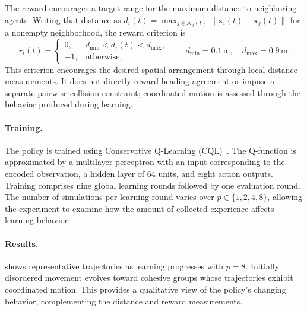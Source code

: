 The reward encourages a target range for the maximum distance to
 neighboring agents.
%
Writing that distance as
 $d_i(t)=\max_{j\in\mathcal{N}_i(t)}
 \|\mathbf{x}_i(t)-\mathbf{x}_j(t)\|$ for a nonempty neighborhood,
 the reward criterion is
\begin{equation}
  r_i(t)=
  \begin{cases}
    0, & d_{\min}<d_i(t)<d_{\max},\\
    -1, & \text{otherwise},
  \end{cases}
  \qquad
  d_{\min}=0.1\,\mathrm{m},\quad
  d_{\max}=0.9\,\mathrm{m}.
  \label{eq:marlalchemy-reward}
\end{equation}
This criterion encourages the desired spatial arrangement through
 local distance measurements.
%
It does not directly reward heading agreement or impose a separate
 pairwise collision constraint; coordinated motion is assessed through
 the behavior produced during learning.

\paragraph{Training.}
The policy is trained using Conservative Q-Learning
 (CQL)~\cite{DBLP:conf/nips/KumarZTL20}.
%
The Q-function is approximated by a multilayer perceptron with an input
 corresponding to the encoded observation, a hidden layer of 64 units,
 and eight action outputs.
%
Training comprises nine global learning rounds followed by one evaluation
 round.
%
The number of simulations per learning round varies over
 $p\in\{1,2,4,8\}$, allowing the experiment to examine how the amount
 of collected experience affects learning behavior.

\paragraph{Results.}
 shows representative trajectories as
 learning progresses with $p=8$.
%
Initially disordered movement evolves toward cohesive groups whose
 trajectories exhibit coordinated motion.
%
This provides a qualitative view of the policy's changing behavior,
 complementing the distance and reward measurements.

